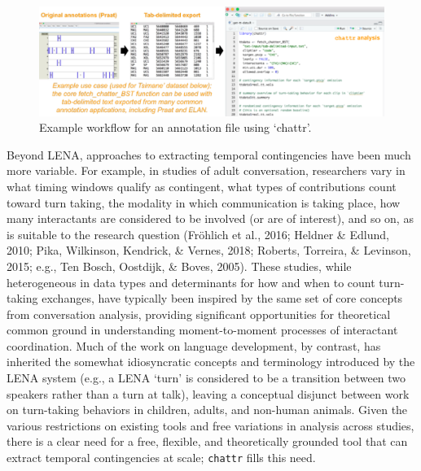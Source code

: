 \documentclass[10pt, letterpaper]{article}
\newenvironment{CodeChunk}{}{}
\begin{document}
\begin{CodeChunk}
\begin{figure}[h]

{\centering \includegraphics{figs/workflow-1} 

}

\caption[Example workflow for an annotation file using `chattr']{Example workflow for an annotation file using `chattr'.}\label{fig:workflow}
\end{figure}
\end{CodeChunk}

Beyond LENA, approaches to extracting temporal contingencies have been
much more variable. For example, in studies of adult conversation,
researchers vary in what timing windows qualify as contingent, what
types of contributions count toward turn taking, the modality in which
communication is taking place, how many interactants are considered to
be involved (or are of interest), and so on, as is suitable to the
research question (Fröhlich et al., 2016; Heldner \& Edlund, 2010; Pika,
Wilkinson, Kendrick, \& Vernes, 2018; Roberts, Torreira, \& Levinson,
2015; e.g., Ten Bosch, Oostdijk, \& Boves, 2005). These studies, while
heterogeneous in data types and determinants for how and when to count
turn-taking exchanges, have typically been inspired by the same set of
core concepts from conversation analysis, providing significant
opportunities for theoretical common ground in understanding
moment-to-moment processes of interactant coordination. Much of the work
on language development, by contrast, has inherited the somewhat
idiosyncratic concepts and terminology introduced by the LENA system
(e.g., a LENA `turn' is considered to be a transition between two
speakers rather than a turn at talk), leaving a conceptual disjunct
between work on turn-taking behaviors in children, adults, and non-human
animals. Given the various restrictions on existing tools and free
variations in analysis across studies, there is a clear need for a free,
flexible, and theoretically grounded tool that can extract temporal
contingencies at scale; \texttt{chattr} fills this need.
\end{document}
